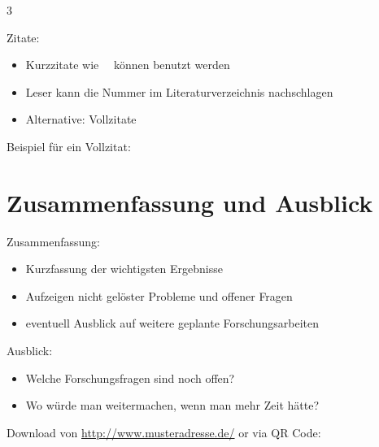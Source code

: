 \documentclass[portrait,20pt]{sciposter}
\begin{document}
\begin{multicols}{3}
\begin{block}{Zitate:}
	\begin{itemize}
		\item Kurzzitate wie~~\cite{lanze:manuskript} können benutzt werden
		\item Leser kann die Nummer im Literaturverzeichnis nachschlagen
		\item Alternative: Vollzitate
	\end{itemize}
\end{block}
\begin{block}{Beispiel für ein Vollzitat:}
	\small{}
\end{block}

\section{Zusammenfassung und Ausblick}

\begin{block}{Zusammenfassung:}
	\begin{itemize}
		\item Kurzfassung der wichtigsten Ergebnisse
		\item Aufzeigen nicht gelöster Probleme und offener Fragen
		\item eventuell Ausblick auf weitere geplante Forschungsarbeiten
	\end{itemize}
\end{block}

\begin{block}{Ausblick:}
	\begin{itemize}
		\item Welche Forschungsfragen sind noch offen?
		\item Wo würde man weitermachen, wenn man mehr Zeit hätte?
	\end{itemize}
\end{block}	

\begin{block}{Download von \url{http://www.musteradresse.de/} or via QR Code:}
	\begin{center}
	\end{center}
\end{block}

\end{multicols}

\printbibliography
\end{document}
